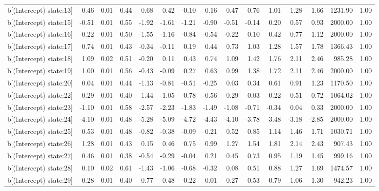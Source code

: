 \begin{table}[ht]
\begin{tabular}{rrrrrrrrrrrrrrr}
  b[(Intercept) state:13] & 0.46 & 0.01 & 0.44 & -0.68 & -0.42 & -0.10 & 0.16 & 0.47 & 0.76 & 1.01 & 1.28 & 1.66 & 1231.90 & 1.00 \\ 
  b[(Intercept) state:15] & -0.51 & 0.01 & 0.55 & -1.92 & -1.61 & -1.21 & -0.90 & -0.51 & -0.14 & 0.20 & 0.57 & 0.93 & 2000.00 & 1.00 \\ 
  b[(Intercept) state:16] & -0.22 & 0.01 & 0.50 & -1.55 & -1.16 & -0.84 & -0.54 & -0.22 & 0.10 & 0.42 & 0.77 & 1.12 & 2000.00 & 1.00 \\ 
  b[(Intercept) state:17] & 0.74 & 0.01 & 0.43 & -0.34 & -0.11 & 0.19 & 0.44 & 0.73 & 1.03 & 1.28 & 1.57 & 1.78 & 1366.43 & 1.00 \\ 
  b[(Intercept) state:18] & 1.09 & 0.02 & 0.51 & -0.20 & 0.11 & 0.43 & 0.74 & 1.09 & 1.42 & 1.76 & 2.11 & 2.46 & 985.28 & 1.00 \\ 
  b[(Intercept) state:19] & 1.00 & 0.01 & 0.56 & -0.43 & -0.09 & 0.27 & 0.63 & 0.99 & 1.38 & 1.72 & 2.11 & 2.46 & 2000.00 & 1.00 \\ 
  b[(Intercept) state:20] & 0.04 & 0.01 & 0.44 & -1.13 & -0.81 & -0.51 & -0.25 & 0.03 & 0.34 & 0.61 & 0.91 & 1.23 & 1170.50 & 1.00 \\ 
  b[(Intercept) state:22] & -0.29 & 0.01 & 0.40 & -1.44 & -1.05 & -0.78 & -0.56 & -0.29 & -0.03 & 0.22 & 0.51 & 0.72 & 1064.02 & 1.00 \\ 
  b[(Intercept) state:23] & -1.10 & 0.01 & 0.58 & -2.57 & -2.23 & -1.83 & -1.49 & -1.08 & -0.71 & -0.34 & 0.04 & 0.33 & 2000.00 & 1.00 \\ 
  b[(Intercept) state:24] & -4.10 & 0.01 & 0.48 & -5.28 & -5.09 & -4.72 & -4.43 & -4.10 & -3.78 & -3.48 & -3.18 & -2.85 & 2000.00 & 1.00 \\ 
  b[(Intercept) state:25] & 0.53 & 0.01 & 0.48 & -0.82 & -0.38 & -0.09 & 0.21 & 0.52 & 0.85 & 1.14 & 1.46 & 1.71 & 1030.71 & 1.00 \\ 
  b[(Intercept) state:26] & 1.28 & 0.01 & 0.43 & 0.15 & 0.46 & 0.75 & 0.99 & 1.27 & 1.54 & 1.81 & 2.14 & 2.43 & 907.43 & 1.00 \\ 
  b[(Intercept) state:27] & 0.46 & 0.01 & 0.38 & -0.54 & -0.29 & -0.04 & 0.21 & 0.45 & 0.73 & 0.95 & 1.19 & 1.45 & 999.16 & 1.00 \\ 
  b[(Intercept) state:28] & 0.10 & 0.02 & 0.61 & -1.43 & -1.06 & -0.68 & -0.32 & 0.08 & 0.51 & 0.88 & 1.27 & 1.69 & 1474.57 & 1.00 \\ 
  b[(Intercept) state:29] & 0.28 & 0.01 & 0.40 & -0.77 & -0.48 & -0.22 & 0.01 & 0.27 & 0.53 & 0.79 & 1.06 & 1.30 & 942.23 & 1.00 \\ 

\end{tabular}
\end{table}
